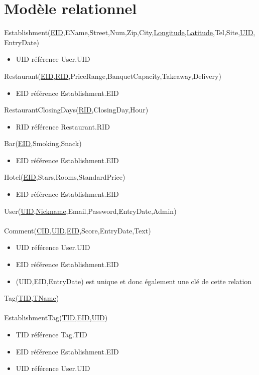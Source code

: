 \documentclass[11pt,a4paper]{report}
\begin{document}
\section*{Modèle relationnel}
\noindent
Establishment(\underline{EID},EName,Street,Num,Zip,City,\underline{Longitude,Latitude},Tel,Site,\underline{UID},EntryDate)
\begin{itemize}
\item UID référence User.UID\\
\end{itemize}
Restaurant(\underline{EID},\underline{RID},PriceRange,BanquetCapacity,Takeaway,Delivery)
\begin{itemize}
\item EID référence Establishment.EID\\
\end{itemize} 
RestaurantClosingDays(\underline{RID},ClosingDay,Hour)
\begin{itemize}
\item RID référence Restaurant.RID\\
\end{itemize}
Bar(\underline{EID},Smoking,Snack)
\begin{itemize}
\item EID référence Establishment.EID\\
\end{itemize}
Hotel(\underline{EID},Stars,Rooms,StandardPrice)
\begin{itemize}
\item EID référence Establishment.EID\\
\end{itemize}
User(\underline{UID},\underline{Nickname},Email,Password,EntryDate,Admin)\\ \\
%
Comment(\underline{CID},\underline{UID},\underline{EID},Score,EntryDate,Text)
\begin{itemize}
\item UID référence User.UID
\item EID référence Establishment.EID
\item (UID,EID,EntryDate) est unique et donc également une clé de cette relation\\
\end{itemize}
Tag(\underline{TID},\underline{TName})\\ \\
EstablishmentTag(\underline{TID,EID,UID})
\begin{itemize}
\item TID référence Tag.TID
\item EID référence Establishment.EID
\item UID référence User.UID\\
\end{itemize}
\end{document}
